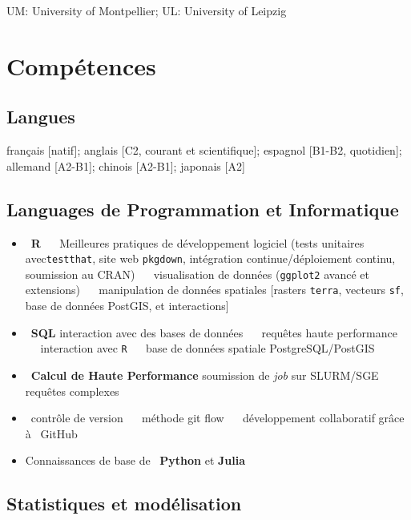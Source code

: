 \documentclass[10pt,a4paper,]{article}
\providecommand{\tightlist}{%
  \setlength{\itemsep}{0pt}\setlength{\parskip}{0pt}}
\begin{document}
UM: University of Montpellier; UL: University of Leipzig

\hypertarget{compuxe9tences}{%
\section{Compétences}\label{compuxe9tences}}

\hypertarget{langues}{%
\subsection{Langues}\label{langues}}

français {[}natif{]}; anglais {[}C2, courant et scientifique{]};
espagnol {[}B1-B2, quotidien{]}; allemand {[}A2-B1{]}; chinois
{[}A2-B1{]}; japonais {[}A2{]}

\hypertarget{languages-de-programmation-et-informatique}{%
\subsection{Languages de Programmation et
Informatique}\label{languages-de-programmation-et-informatique}}

\begin{itemize}
\tightlist
\item
  \faRProject~\textbf{R} ~\textbullet~ Meilleures pratiques de
  développement logiciel (tests unitaires avec\texttt{testthat}, site
  web \texttt{pkgdown}, intégration continue/déploiement continu,
  soumission au CRAN) ~\textbullet~ visualisation de données
  (\texttt{ggplot2} avancé et extensions) ~\textbullet~ manipulation de
  données spatiales {[}rasters \texttt{terra}, vecteurs \texttt{sf},
  base de données PostGIS, et interactions{]}
\item
  \faDatabase~\textbf{SQL} interaction avec des bases de données
  ~\textbullet~ requêtes haute performance ~\textbullet~ interaction
  avec \texttt{R} ~\textbullet~ base de données spatiale
  PostgreSQL/PostGIS
\item
  \faServer~\textbf{Calcul de Haute Performance} soumission de
  \emph{job} sur SLURM/SGE ~\textbullet~ requêtes complexes
\item
  \faGit~contrôle de version ~\textbullet~ méthode git flow
  ~\textbullet~ développement collaboratif grâce à \faGithub~GitHub
\item
  Connaissances de base de \faPython~\textbf{Python} et \textbf{Julia}
\end{itemize}

\hypertarget{statistiques-et-moduxe9lisation}{%
\subsection{Statistiques et
modélisation}\label{statistiques-et-moduxe9lisation}}
\end{document}
